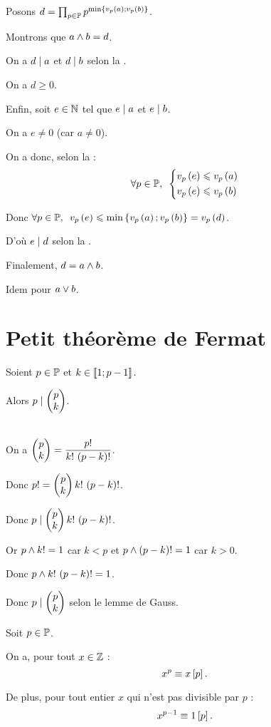 \begin{dem}
Posons \(d=\prod_{p\in\prem}p^{\min\accol{\valp{p}{a};\valp{p}{b}}}\).

Montrons que \(a\et b=d\).

On a \(d\divise a\) et \(d\divise b\) selon la .

On a \(d\geq0\).

Enfin, soit \(e\in\N\) tel que \(e\divise a\) et \(e\divise b\).

On a \(e\not=0\) (car \(a\not=0\)).

On a donc, selon la  : \[\quantifs{\forall p\in\prem}\begin{dcases}\valp{p}{e}\leq\valp{p}{a} \\ \valp{p}{e}\leq\valp{p}{b}\end{dcases}\]

Donc \(\quantifs{\forall p\in\prem}\valp{p}{e}\leq\min\accol{\valp{p}{a};\valp{p}{b}}=\valp{p}{d}\).

D'où \(e\divise d\) selon la .

Finalement, \(d=a\et b\).

Idem pour \(a\ou b\).
\end{dem}

\section{Petit théorème de Fermat}

\begin{lem}
Soient \(p\in\prem\) et \(k\in\interventierii{1}{p-1}\).

Alors \(p\divise\binom{k}{p}\).
\end{lem}

\begin{dem}~\\
On a \(\binom{k}{p}=\dfrac{p!}{k!\,\paren{p-k}!}\).

Donc \(p!=\binom{k}{p}k!\,\paren{p-k}!\).

Donc \(p\divise\binom{k}{p}k!\,\paren{p-k}!\).

Or \(p\et k!=1\) car \(k<p\) et \(p\et\paren{p-k}!=1\) car \(k>0\).

Donc \(p\et k!\,\paren{p-k}!=1\).

Donc \(p\divise\binom{k}{p}\) selon le lemme de Gauss.
\end{dem}

\begin{theo}
Soit \(p\in\prem\).

On a, pour tout \(x\in\Z\) : \[x^p\equiv x\croch{p}.\]

De plus, pour tout entier \(x\) qui n'est pas divisible par \(p\) : \[x^{p-1}\equiv1\croch{p}.\]
\end{theo}

